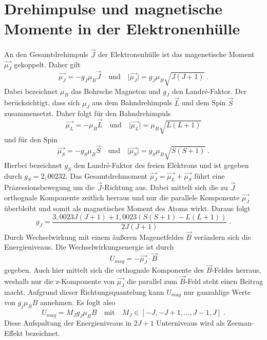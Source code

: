 \section{Drehimpulse und magnetische Momente in der Elektronenhülle}
An den Gesamtdrehimpuls $ \vec{J}$ der Elektronenhülle ist das magenetische Moment $\vec{\mu_J}$ 
gekoppelt. Daher gilt
\begin{equation}
\vec{\mu_J} = -g_J \mu_B \vec{J} \quad \text{und} \quad 
\lvert \vec{\mu_J} \rvert = g_J \mu_B \sqrt{J(J+1)}  \; .
\label{eq:muJ}
\end{equation}
Dabei bezeichnet $\mu_B$ das Bohrsche Magneton und $g_J$ den Landr\'{e}-Faktor. Der berücksichtigt, 
dass sich $\mu_J$ aus dem Bahndrehimpuls $\vec{L}$ und dem Spin $\vec{S}$ zusammensetzt. 
Daher folgt für den Bahndrehimpuls 
\begin{equation}
\vec{\mu_L} = - \mu_B \vec{L} \quad \text{und} \quad 
\lvert \vec{\mu_L} \rvert =  \mu_B \sqrt{L(L+1)} 
\label{eq:muL}
\end{equation}
und für den Spin 
\begin{equation}
\vec{\mu_S} = - g_S \mu_B \vec{S} \quad \text{und} \quad 
\lvert \vec{\mu_S} \rvert = 	g_S \mu_B \sqrt{S(S+1)} \; .
\label{eq:muS}
\end{equation}
Hierbei bezeichnet $g_S$ den Landr\'{e}-Faktor des freien Elektrons und ist gegeben durch 
$ g_S = 2,00232$. Das Gesamtdrehmoment $\vec{\mu_J} = \vec{\mu_L}+\vec{\mu_S}$ führt eine 
Präzessionsbewegung um die $\vec{J}$-Richtung aus. Dabei mittelt sich die zu $\vec{J}$ 
orthognale Komponente zeitlich herraus und nur die parallele Komponente $\vec{\mu_J}$  
überbleibt und somit als magnetisches Moment des Atoms wirkt. Daraus folgt
\begin{equation}
g_J = \frac{3,0023J(J+1) + 1,0023(S(S+1) - L(L+1))}{2J(J+1)}\; .	
\label{eq:gJ}
\end{equation}
Durch Wechselwirkung mit einem äußeren Magenetfeldes $\vec{B}$ verändern sich die Energieniveaus. 
Die Wechselwirkungsenergie ist durch 
\begin{equation}
U_{mag} = - \vec{\mu_J} \cdot \vec{B} 	
\end{equation}
gegeben. Auch hier mittelt sich die orthognale Komponente des $\vec{B}$-Feldes herraus, weshalb nur 
die z-Komponente von $\vec{\mu_J}$  die parallel zum $\vec{B}$-Feld steht einen Beitrag macht. 
Aufgrund dieser Richtungsquantelung kann $U_{mag}$ nur ganzahlige Werte von $g_j \mu_B B$ 
annehmen. Es foglt also 
\begin{equation}
U_{mag} = M_J g_J \mu_B B \quad \text{mit} \quad M_J \in [-J,-J+1,...,J-1,J] \; .	
\end{equation}
Diese Aufspaltung der Energieniveaus in $2J+1$ Unterniveaus wird als Zeeman-Effekt bezeichnet.

